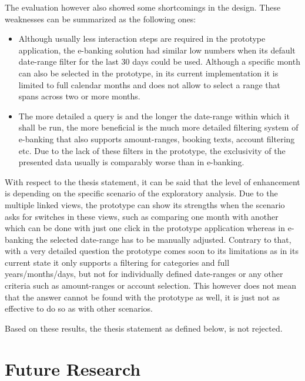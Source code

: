 The evaluation however also showed some shortcomings in the design. These weaknesses can be summarized as the following ones:
\begin{itemize}[]
	\item Although usually less interaction steps are required in the prototype application, the e-banking solution had similar low numbers when its default date-range filter for the last 30 days could be used. Although a specific month can also be selected in the prototype, in its current implementation it is limited to full calendar months and does not allow to select a range that spans across two or more months.
	\item The more detailed a query is and the longer the date-range within which it shall be run, the more beneficial is the much more detailed filtering system of e-banking that also supports amount-ranges, booking texts, account filtering etc. Due to the lack of these filters in the prototype, the exclusivity of the presented data usually is comparably worse than in e-banking.
\end{itemize}

With respect to the thesis statement, it can be said that the level of enhancement is depending on the specific scenario of the exploratory analysis. Due to the multiple linked views, the prototype can show its strengths when the scenario asks for switches in these views, such as comparing one month with another which can be done with just one click in the prototype application whereas in e-banking the selected date-range has to be manually adjusted. Contrary to that, with a very detailed question the prototype comes soon to its limitations as in its current state it only supports a filtering for categories and full years/months/days, but not for individually defined date-ranges or any other criteria such as amount-ranges or account selection. This however does not mean that the answer cannot be found with the prototype as well, it is just not as effective to do so as with other scenarios.

Based on these results, the thesis statement as defined below, is not rejected.
\begin{framed}
	\textit{\thesisstatementtext}
\end{framed}



\section{Future Research}

